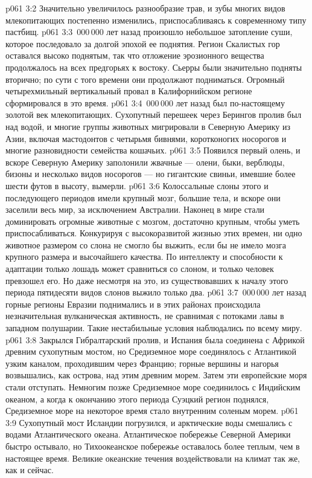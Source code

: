 \vs p061 3:2 Значительно увеличилось разнообразие трав, и зубы многих видов млекопитающих постепенно изменились, приспосабливаясь к современному типу пастбищ.
\vs p061 3:3 \,000\,000 лет назад произошло небольшое затопление суши, которое последовало за долгой эпохой ее поднятия. Регион Скалистых гор оставался высоко поднятым, так что отложение эрозионного вещества продолжалось на всех предгорьях к востоку. Сьерры были значительно подняты вторично; по сути с того времени они продолжают подниматься. Огромный четырехмильный вертикальный провал в Калифорнийском регионе сформировался в это время.
\vs p061 3:4 \,000\,000 лет назад был по\hyp{}настоящему золотой век млекопитающих. Сухопутный перешеек через Берингов пролив был над водой, и многие группы животных мигрировали в Северную Америку из Азии, включая мастодонтов с четырьмя бивнями, коротконогих носорогов и многие разновидности семейства кошачьих.
\vs p061 3:5 Появился первый олень, и вскоре Северную Америку заполонили жвачные --- олени, быки, верблюды, бизоны и несколько видов носорогов --- но гигантские свиньи, имевшие более шести футов в высоту, вымерли.
\vs p061 3:6 Колоссальные слоны этого и последующего периодов имели крупный мозг, большие тела, и вскоре они заселили весь мир, за исключением Австралии. Наконец в мире стали доминировать огромные животные с мозгом, достаточно крупным, чтобы уметь приспосабливаться. Конкурируя с высокоразвитой жизнью этих времен, ни одно животное размером со слона не смогло бы выжить, если бы не имело мозга крупного размера и высочайшего качества. По интеллекту и способности к адаптации только лошадь может сравниться со слоном, и только человек превзошел его. Но даже несмотря на это, из существовавших к началу этого периода пятидесяти видов слонов выжило только два.
\vs p061 3:7 \,000\,000 лет назад горные регионы Евразии поднимались и в этих районах происходила незначительная вулканическая активность, не сравнимая с потоками лавы в западном полушарии. Такие нестабильные условия наблюдались по всему миру.
\vs p061 3:8 Закрылся Гибралтарский пролив, и Испания была соединена с Африкой древним сухопутным мостом, но Средиземное море соединялось с Атлантикой узким каналом, проходившим через Францию; горные вершины и нагорья возвышались, как острова, над этим древним морем. Затем эти европейские моря стали отступать. Немногим позже Средиземное море соединилось с Индийским океаном, а когда к окончанию этого периода Суэцкий регион поднялся, Средиземное море на некоторое время стало внутренним соленым морем.
\vs p061 3:9 Сухопутный мост Исландии погрузился, и арктические воды смешались с водами Атлантического океана. Атлантическое побережье Северной Америки быстро остывало, но Тихоокеанское побережье оставалось более теплым, чем в настоящее время. Великие океанские течения воздействовали на климат так же, как и сейчас.
